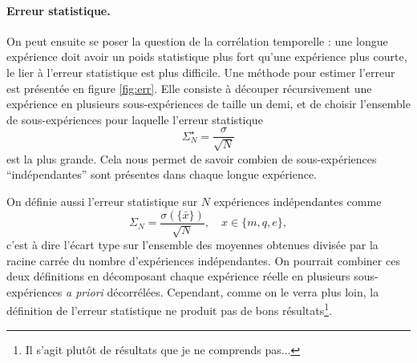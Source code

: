 \documentclass[a4paper, 11pt]{article}
\begin{document}
\paragraph{Erreur statistique.}
On peut ensuite se poser la question de la corrélation temporelle : une longue expérience doit avoir
un poids statistique plus fort qu'une expérience plus courte, le lier à l'erreur statistique est
plus difficile. Une méthode pour estimer l'erreur est présentée en figure \ref{fig:err}. Elle
consiste à découper récursivement une expérience en plusieurs sous-expériences de taille un demi, et
de choisir l'ensemble de sous-expériences pour laquelle l'erreur statistique
\begin{equation*}
    \Sigma_N^\star = \frac{\sigma}{\sqrt{N}}
\end{equation*}
est la plus grande. Cela nous permet de savoir combien de sous-expériences ``indépendantes'' sont
présentes dans chaque longue expérience.

On définie aussi l'erreur statistique sur $N$ expériences indépendantes comme 
\begin{equation*}
    \Sigma_N = \frac{\sigma( \{ \bar{x} \} )}{\sqrt{N}}, \quad x \in \{m, q, e\},
\end{equation*}
c'est à dire l'écart type sur l'ensemble des moyennes obtenues divisée par la racine carrée du
nombre d'expériences indépendantes. On pourrait combiner ces deux définitions en décomposant chaque
expérience réelle en plusieurs sous-expériences \emph{a priori} décorrélées. Cependant, comme on le
verra plus loin, la définition de l'erreur statistique ne produit pas de bons résultats\footnote{Il
s'agit plutôt de résultats que je ne comprends pas...}.  
\end{document}
